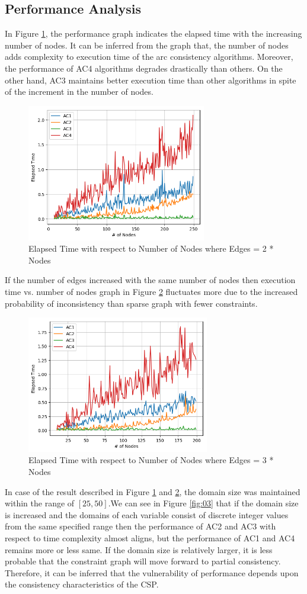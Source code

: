 \documentclass[10pt,twocolumn]{article}
\begin{document}
\subsection{Performance Analysis}
In Figure \ref{fig:01}, the performance graph indicates the elapsed time with the increasing number of nodes. It can be inferred from the graph that, the number of nodes adds complexity to execution time of the arc consistency algorithms. Moreover, the performance of AC4 algorithms degrades drastically than others. On the other hand, AC3 maintains better execution time than other algorithms in spite of the increment in the number of nodes. 
\begin{figure}[H]
	\includegraphics[width = \columnwidth, height = 6cm]{fig1}
	\caption{Elapsed Time with respect to Number of Nodes where Edges = 2 * Nodes}
	\label{fig:01}
\end{figure}
If the number of edges increased with the same number of nodes then execution time vs. number of nodes graph in Figure \ref{fig:02} fluctuates more due to the increased probability of inconsistency than sparse graph with fewer constraints.   
\begin{figure}[H]
	\includegraphics[width = \columnwidth, height = 6cm]{fig2}
	\caption{Elapsed Time with respect to Number of Nodes where Edges = 3 * Nodes}
	\label{fig:02}
\end{figure}
In case of the result described in Figure \ref{fig:01} and \ref{fig:02}, the domain size was maintained within the range of $ [25, 50] $.We can see in Figure \ref{fig:03} that if the domain size is increased and the domains of each variable consist of discrete integer values from the same specified range then the performance of AC2 and AC3 with respect to time complexity almost aligns, but the performance of AC1 and AC4 remains more or less same. If the domain size is relatively larger, it is less probable that the constraint graph will move forward to partial consistency. Therefore, it can be inferred that the vulnerability of performance depends upon the consistency characteristics of the CSP. 
\end{document}
